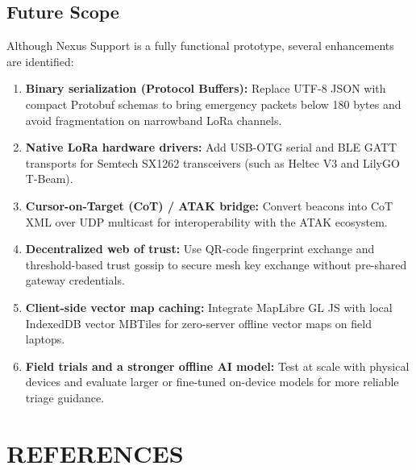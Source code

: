 \documentclass[12pt,a4paper]{report}
\begin{document}
\section{Future Scope}
Although Nexus Support is a fully functional prototype, several enhancements are identified:
\begin{enumerate}
    \item \textbf{Binary serialization (Protocol Buffers):} Replace UTF-8 JSON with compact Protobuf schemas to bring emergency packets below 180 bytes and avoid fragmentation on narrowband LoRa channels.
    \item \textbf{Native LoRa hardware drivers:} Add USB-OTG serial and BLE GATT transports for Semtech SX1262 transceivers (such as Heltec V3 and LilyGO T-Beam).
    \item \textbf{Cursor-on-Target (CoT) / ATAK bridge:} Convert beacons into CoT XML over UDP multicast for interoperability with the ATAK ecosystem.
    \item \textbf{Decentralized web of trust:} Use QR-code fingerprint exchange and threshold-based trust gossip to secure mesh key exchange without pre-shared gateway credentials.
    \item \textbf{Client-side vector map caching:} Integrate MapLibre GL JS with local IndexedDB vector MBTiles for zero-server offline vector maps on field laptops.
    \item \textbf{Field trials and a stronger offline AI model:} Test at scale with physical devices and evaluate larger or fine-tuned on-device models for more reliable triage guidance.
\end{enumerate}

\chapter{REFERENCES}
\end{document}
